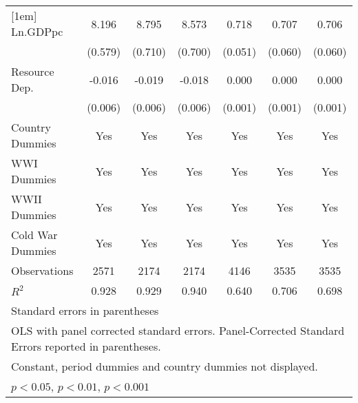 \begin{table}[!htbp]
{\begin{tabular}{l*{6}{c}}
					[1em]
					Ln.GDPpc            &       8.196\sym{***}&       8.795\sym{***}&       8.573\sym{***}&       0.718\sym{***}&       0.707\sym{***}&       0.706\sym{***}\\
					                    &     (0.579)         &     (0.710)         &     (0.700)         &     (0.051)         &     (0.060)         &     (0.060)         \\
					[1em]
					Resource Dep.       &      -0.016\sym{**} &      -0.019\sym{**} &      -0.018\sym{**} &       0.000         &       0.000         &       0.000         \\
					                    &     (0.006)         &     (0.006)         &     (0.006)         &     (0.001)         &     (0.001)         &     (0.001)         \\
					[1em]
					Country Dummies     &         Yes         &         Yes         &         Yes         &         Yes         &         Yes         &         Yes         \\
					[1em]
					WWI Dummies         &         Yes         &         Yes         &         Yes         &         Yes         &         Yes         &         Yes         \\
					[1em]
					WWII Dummies        &         Yes         &         Yes         &         Yes         &         Yes         &         Yes         &         Yes         \\
					[1em]
					Cold War Dummies    &         Yes         &         Yes         &         Yes         &         Yes         &         Yes         &         Yes         \\
					\hline
					Observations        &        2571         &        2174         &        2174         &        4146         &        3535         &        3535         \\
					\(R^{2}\)           &       0.928         &       0.929         &       0.940         &       0.640         &       0.706         &       0.698         \\
		\hline
		\multicolumn{7}{l}{\footnotesize Standard errors in parentheses}\\
		\multicolumn{7}{l}{\footnotesize OLS with panel corrected standard errors. Panel-Corrected Standard Errors reported in parentheses.}\\
		\multicolumn{7}{l}{\footnotesize Constant, period dummies and country dummies not displayed.}\\
		\multicolumn{7}{l}{\footnotesize \sym{*} \(p<0.05\), \sym{**} \(p<0.01\), \sym{***} \(p<0.001\)}\\
		\bottomrule
		\end{tabular}}
		\label{tab:table1}
\end{table}